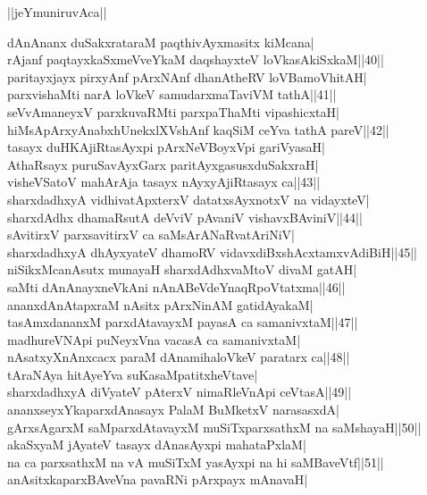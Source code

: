 \documentclass{article}
\begin{document}
\begin{center}
||jeYmuniruvAca||
\end{center}

dAnAnanx duSakxrataraM paqthivAyxmasitx kiMcana|\\
rAjanf paqtayxkaSxmeVveYkaM daqshayxteV loVkasAkiSxkaM||40||\\
paritayxjayx pirxyAnf pArxNAnf dhanAtheRV loVBamoVhitAH|\\
parxvishaMti narA loVkeV samudarxmaTaviVM tathA||41||\\
seVvAmaneyxV parxkuvaRMti parxpaThaMti vipashicxtaH|\\
hiMsApArxyAnabxhUnekxlXVshAnf kaqSiM ceYva tathA pareV||42||\\
tasayx duHKAjiRtasAyxpi pArxNeVBoyxVpi gariVyasaH|\\
AthaRsayx puruSavAyxGarx paritAyxgasusxduSakxraH|\\
visheVSatoV mahArAja tasayx nAyxyAjiRtasayx ca||43||\\
sharxdadhxyA vidhivatApxterxV datatxsAyxnotxV na vidayxteV|\\
sharxdAdhx dhamaRsutA deVviV pAvaniV vishavxBAviniV||44||\\
sAvitirxV parxsavitirxV ca saMsArANaRvatAriNiV|\\
sharxdadhxyA dhAyxyateV dhamoRV vidavxdiBxshAcxtamxvAdiBiH||45||\\
niSikxMcanAsutx munayaH sharxdAdhxvaMtoV divaM gatAH|\\
saMti dAnAnayxneVkAni nAnABeVdeYnaqRpoVtatxma||46||\\
ananxdAnAtapxraM nAsitx pArxNinAM gatidAyakaM|\\
tasAmxdananxM parxdAtavayxM payasA ca samanivxtaM||47||\\
madhureVNApi puNeyxVna vacasA ca samanivxtaM|\\
nAsatxyXnAnxcacx paraM dAnamihaloVkeV paratarx ca||48||\\
tAraNAya hitAyeYva suKasaMpatitxheVtave|\\
sharxdadhxyA diVyateV pAterxV nimaRleVnApi ceVtasA||49||\\
ananxseyxYkaparxdAnasayx PalaM BuMketxV narasasxdA|\\
gArxsAgarxM saMparxdAtavayxM muSiTxparxsathxM na saMshayaH||50||\\
akaSxyaM jAyateV tasayx dAnasAyxpi mahataPxlaM|\\
na ca parxsathxM na vA muSiTxM yasAyxpi na hi saMBaveVtf||51||\\
anAsitxkaparxBAveVna pavaRNi pArxpayx mAnavaH|\\
\end{document}

